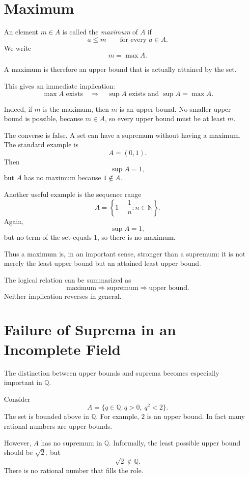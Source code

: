 \documentclass{essay}
\begin{document}
\section{Maximum}

An element $m\in A$ is called the \emph{maximum} of $A$ if
\[
    a\leq m
    \qquad\text{for every }a\in A.
\]
We write
\[
    m=\max A.
\]

A maximum is therefore an upper bound that is actually attained by the set.

This gives an immediate implication:
\[
    \max A \text{ exists}
    \quad\Longrightarrow\quad
    \sup A \text{ exists and }\sup A=\max A.
\]

Indeed, if $m$ is the maximum, then $m$ is an upper bound. No smaller upper bound is possible, because $m\in A$, so every upper bound must be at least $m$.

The converse is false. A set can have a supremum without having a maximum. The standard example is
\[
    A=(0,1).
\]
Then
\[
    \sup A=1,
\]
but $A$ has no maximum because $1\notin A$.

Another useful example is the sequence range
\[
    A=\left\{1-\frac1n:n\in\mathbb{N}\right\}.
\]
Again,
\[
    \sup A=1,
\]
but no term of the set equals $1$, so there is no maximum.

Thus a maximum is, in an important sense, stronger than a supremum: it is not merely the least upper bound but an attained least upper bound.

The logical relation can be summarized as
\[
    \text{maximum} \Longrightarrow \text{supremum} \Longrightarrow \text{upper bound}.
\]
Neither implication reverses in general.

\section{Failure of Suprema in an Incomplete Field}

The distinction between upper bounds and suprema becomes especially important in $\mathbb{Q}$.

Consider
\[
    A=\{q\in\mathbb{Q}:q>0,\ q^2<2\}.
\]
The set is bounded above in $\mathbb{Q}$. For example, $2$ is an upper bound. In fact many rational numbers are upper bounds.

However, $A$ has no supremum in $\mathbb{Q}$. Informally, the least possible upper bound should be $\sqrt{2}$, but
\[
    \sqrt{2}\notin\mathbb{Q}.
\]
There is no rational number that fills the role.
\end{document}
